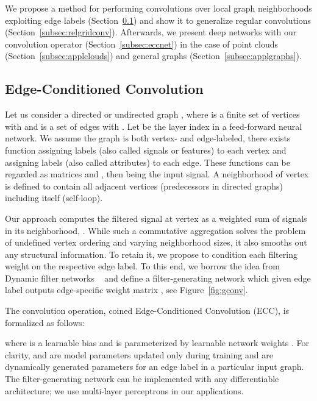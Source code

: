 \documentclass[10pt,twocolumn,letterpaper]{article}
\begin{document}
We propose a method for performing convolutions over local graph neighborhoods exploiting edge labels (Section~\ref{subsec:ecc}) and show it to generalize regular convolutions (Section~\ref{subsec:relgridconv}). Afterwards, we present deep networks with our convolution operator (Section~\ref{subsec:eccnet}) in the case of point clouds (Section~\ref{subsec:applclouds}) and general graphs (Section~\ref{subsec:applgraphs}).






\subsection{Edge-Conditioned Convolution} \label{subsec:ecc}

Let us consider a directed or undirected graph , where  is a finite set of vertices with  and  is a set of edges with . Let  be the layer index in a feed-forward neural network. We assume the graph is both vertex- and edge-labeled, \ie there exists function  assigning labels (also called signals or features) to each vertex and  assigning labels (also called attributes) to each edge. These functions can be regarded as matrices  and ,  then being the input signal. A neighborhood  of vertex  is defined to contain all adjacent vertices (predecessors in directed graphs) including  itself (self-loop).

\def\dimo{{\mathbb{R}^{d_l}}}
\def\dimi{{\mathbb{R}^{d_{l-1}}}}
\def\dimjoint{{\mathbb{R}^{d_l\times d_{l-1}}}}

Our approach computes the filtered signal  at vertex  as a weighted sum of signals  in its neighborhood, . While such a commutative aggregation solves the problem of undefined vertex ordering and varying neighborhood sizes, it also smooths out any structural information. To retain it, we propose to condition each filtering weight on the respective edge label. To this end, we borrow the idea from Dynamic filter networks ~\cite{dfn16} and define a filter-generating network   which given edge label  outputs edge-specific weight matrix , see Figure~\ref{fig:gconv}. 

The convolution operation, coined Edge-Conditioned Convolution (ECC), is formalized as follows:



where  is a learnable bias and  is parameterized by learnable network weights . For clarity,  and  are model parameters updated only during training and  are dynamically generated parameters for an edge label in a particular input graph. The filter-generating network  can be implemented with any differentiable architecture; we use multi-layer perceptrons in our applications.
\end{document}
